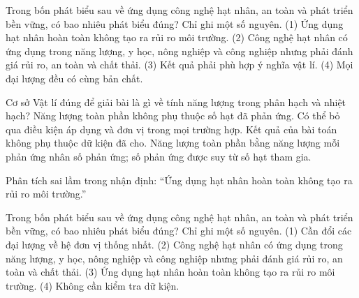 \begin{ex}
Trong bốn phát biểu sau về ứng dụng công nghệ hạt nhân, an toàn và phát triển bền vững, có bao nhiêu phát biểu đúng? Chỉ ghi một số nguyên. (1) Ứng dụng hạt nhân hoàn toàn không tạo ra rủi ro môi trường. (2) Công nghệ hạt nhân có ứng dụng trong năng lượng, y học, nông nghiệp và công nghiệp nhưng phải đánh giá rủi ro, an toàn và chất thải. (3) Kết quả phải phù hợp ý nghĩa vật lí. (4) Mọi đại lượng đều có cùng bản chất.
\end{ex}

\begin{ex}
Cơ sở Vật lí đúng để giải bài là gì về tính năng lượng trong phân hạch và nhiệt hạch?
\choice
{Năng lượng toàn phần không phụ thuộc số hạt đã phản ứng.}
{Có thể bỏ qua điều kiện áp dụng và đơn vị trong mọi trường hợp.}
{Kết quả của bài toán không phụ thuộc dữ kiện đã cho.}
{\True Năng lượng toàn phần bằng năng lượng mỗi phản ứng nhân số phản ứng; số phản ứng được suy từ số hạt tham gia.}
\end{ex}

\begin{bt}
Phân tích sai lầm trong nhận định: “Ứng dụng hạt nhân hoàn toàn không tạo ra rủi ro môi trường.”
\end{bt}

\begin{ex}
Trong bốn phát biểu sau về ứng dụng công nghệ hạt nhân, an toàn và phát triển bền vững, có bao nhiêu phát biểu đúng? Chỉ ghi một số nguyên. (1) Cần đổi các đại lượng về hệ đơn vị thống nhất. (2) Công nghệ hạt nhân có ứng dụng trong năng lượng, y học, nông nghiệp và công nghiệp nhưng phải đánh giá rủi ro, an toàn và chất thải. (3) Ứng dụng hạt nhân hoàn toàn không tạo ra rủi ro môi trường. (4) Không cần kiểm tra dữ kiện.
\end{ex}

